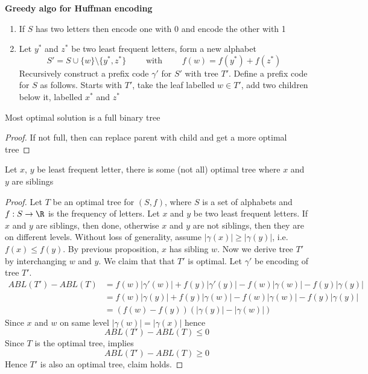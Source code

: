 \documentclass[11pt]{article}
\begin{document}
\begin{example}
\begin{enumerate}
    \begin{defn*}
      \textbf{Greedy algo for Huffman encoding}
      \begin{enumerate}
        \item If $S$ has two letters then encode one with 0 and encode the other with 1
        \item Let $y^*$ and $z^*$ be two least frequent letters, form a new alphabet
        \[
          S' = S \cup \{ w \} \setminus \{ y^* , z^*\} \quad\quad \text{ with } \quad \quad f(w) = f(y^*) + f(z^*)
        \]
        Recursively construct a prefix code $\gamma'$ for $S'$ with tree $T'$. Define a prefix code for $S$ as follows. Starts with $T'$, take the leaf labelled $w \in T'$, add two children below it, labelled $x^*$ and $z^*$
      \end{enumerate}
    \end{defn*}



    \begin{proposition*}
      Most optimal solution is a full binary tree
      \begin{proof}
        If not full, then can replace parent with child and get a more optimal tree
      \end{proof}
    \end{proposition*}



    \begin{proposition*}
      Let $x$, $y$ be least frequent letter, there is some (not all) optimal tree where $x$ and $y$ are siblings

      \begin{proof}
        Let $T$ be an optimal tree for $(S, f)$, where $S$ is a set of alphabets and $f: S \to \R$ is the frequency of letters. Let $x$ and $y$ be two least frequent letters. If $x$ and $y$ are siblings, then done, otherwise $x$ and $y$ are not siblings, then they are on different levels. Without loss of generality, assume $|\gamma(x)| \geq |\gamma(y)|$, i.e. $f(x) \leq f(y)$. By previous proposition, $x$ has sibling $w$. Now we derive tree $T'$ by interchanging $w$ and $y$. We claim that that $T'$ is optimal. Let $\gamma'$ be encoding of tree $T'$.
        \begin{align*}
          ABL(T') - ABL(T)
          &= f(w)|\gamma'(w)| + f(y)|\gamma'(y)| -  f(w)|\gamma(w)| - f(y)|\gamma(y)| \\
          &= f(w)|\gamma(y)| + f(y)|\gamma(w)| - f(w)|\gamma(w)| - f(y)|\gamma(y)| \\
          &= (f(w) - f(y))(|\gamma(y)| - |\gamma(w)|)
        \end{align*}
        Since $x$ and $w$ on same level $|\gamma(w)| = |\gamma(x)|$ hence
        \[
          ABL(T') - ABL(T) \leq 0
        \]
        Since $T$ is the optimal tree, implies
        \[
          ABL(T') - ABL(T) \geq 0
        \]
        Hence $T'$ is also an optimal tree, claim holds.
      \end{proof}
    \end{proposition*}



\end{enumerate}
\end{example}
\end{document}
